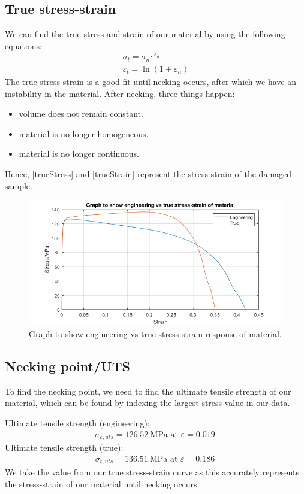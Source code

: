 \documentclass[11pt]{article}
\numberwithin{equation}{section}
\begin{document}
\subsection{True stress-strain}
We can find the true stress and strain of our material by using the following equations:
\begin{gather}
    \sigma_t = \sigma_n e^{\varepsilon_n}\label{trueStress} \\
    \varepsilon_t = \ln\left(1 + \varepsilon_n\right) \label{trueStrain}
\end{gather}
The true stress-strain is a good fit until necking occurs, after which we have an instability in the material. After necking, three things happen:
\begin{itemize}
    \item volume does not remain constant.
    \item material is no longer homogeneous.
    \item material is no longer continuous.
\end{itemize}
Hence, \ref{trueStress} and \ref{trueStrain} represent the stress-strain of the damaged sample. 
\begin{figure}[H]
    \centering
    \includegraphics[width = \textwidth]{./img/engVsTrueStressStrain.png}
    \caption{Graph to show engineering vs true stress-strain response of material.}
    \label{engVsTrueStressStrainCurve}
\end{figure}
\subsection{Necking point/UTS}
To find the necking point, we need to find the ultimate tensile strength of our material, which can be found by indexing the largest stress value in our data.

Ultimate tensile strength (engineering):
\begin{gather}
    \sigma_{e,uts} = \SI{126.52}{\mega\pascal} \textrm{ at } \varepsilon = \SI{0.019}{}
\end{gather}
Ultimate tensile strength (true):
\begin{gather}
    \sigma_{t,uts} = \SI{136.51}{\mega\pascal} \textrm{ at } \varepsilon = \SI{0.186}{}
\end{gather}
We take the value from our true stress-strain curve as this accurately represents the stress-strain of our material until necking occurs.
\end{document}
